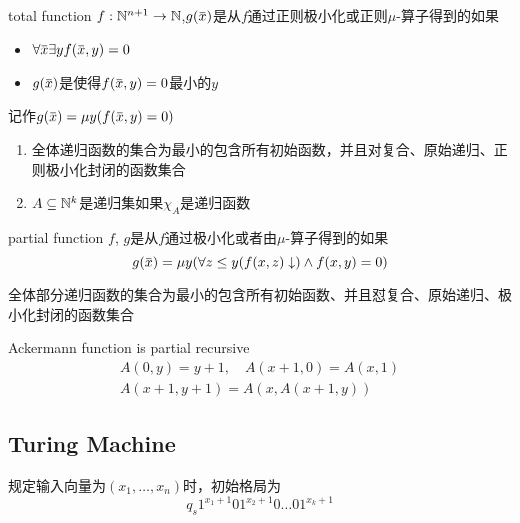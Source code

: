 \documentclass[11pt]{article}
\begin{document}
\begin{definition}[]
total function \(f:\mathbb{N}^{n+1}\to\mathbb{N}\),\(g(\barx)\)是从\(f\)通过正则极小化或正则\(\mu\)-算子得到的如果
\begin{itemize}
\item \(\forall\barx\exists yf(\barx,y)=0\)
\item \(g(\barx)\)是使得\(f(\barx,y)=0\)最小的\(y\)
\end{itemize}


记作\(g(\barx)=\mu y(f(\barx,y)=0)\)
\end{definition}

\begin{definition}[]
\begin{enumerate}
\item 全体递归函数的集合为最小的包含所有初始函数，并且对复合、原始递归、正则极小化封闭的函数集合
\item \(A\subseteq\mathbb{N}^k\)是递归集如果\(\chi_A\)是递归函数
\end{enumerate}
\end{definition}

\begin{definition}[]
partial function \(f\), \(g\)是从\(f\)通过极小化或者由\(\mu\)-算子得到的如果
\begin{equation*}
g(\barx)=\mu y(\forall z\le y(f(x,z)\downarrow)\wedge f(x,y)=0)
\end{equation*}
\end{definition}

\begin{definition}[]
全体部分递归函数的集合为最小的包含所有初始函数、并且怼复合、原始递归、极小化封闭的函数集合
\end{definition}

\begin{lemma}[]
Ackermann function is partial recursive
\begin{gather*}
A(0,y)=y+1,\quad A(x+1,0)=A(x,1)\\
A(x+1,y+1)=A(x,A(x+1,y))
\end{gather*}
\end{lemma}
\subsection{Turing Machine}
\label{sec:org1697bab}
规定输入向量为\((x_1,\dots,x_n)\)时，初始格局为
\begin{equation*}
q_s1^{x_1+1}01^{x_2+1}0\dots 01^{x_k+1}
\end{equation*}
\end{document}
